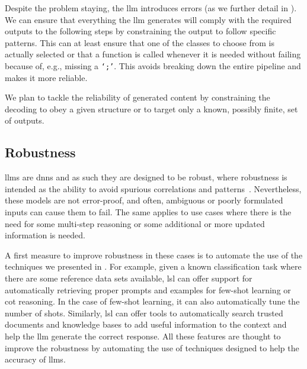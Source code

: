 \documentclass[manuscript,screen]{acmart}
\begin{document}
Despite the problem staying, the \ac{llm} introduces errors (as we further detail in ).
We can ensure that everything the \ac{llm} generates will comply with the required outputs to the following steps by constraining the output to follow specific patterns.
This can at least ensure that one of the classes to choose from is actually selected or that a function is called whenever it is needed without failing because of, e.g., missing a \texttt{`;'}.
This avoids breaking down the entire pipeline and makes it more reliable.

\begin{tcolorbox}[
    title=Reliability, %
    left=1mm,
    right=1mm,
    top=1mm,
    bottom=1mm,
    fonttitle=\bfseries, %
    boxrule=0.5pt, %
    arc=5pt, %
    width=\columnwidth %
]
We plan to tackle the reliability of generated content by constraining the decoding to obey a given structure or to target only a known, possibly finite, set of outputs.
\end{tcolorbox}

\subsection{Robustness}
\label{sec:robustness}

\acp{llm} are \acp{dnn} and as such they are designed to be robust, where robustness is intended as the ability to avoid spurious correlations and patterns~\cite{DBLP:books/daglib/0040158,DBLP:conf/nips/BrownMRSKDNSSAA20}.
Nevertheless, these models are not error-proof, and often, ambiguous or poorly formulated inputs can cause them to fail.
The same applies to use cases where there is the need for some multi-step reasoning or some additional or more updated information is needed.


A first measure to improve robustness in these cases is to automate the use of the techniques we presented in .
For example, given a known classification task where there are some reference data sets available, \ac{lsl} can offer support for automatically retrieving proper prompts and examples for few-shot learning or \ac{cot} reasoning.
In the case of few-shot learning, it can also automatically tune the number of shots.
Similarly, \ac{lsl} can offer tools to automatically search trusted documents and knowledge bases to add useful information to the context and help the \ac{llm} generate the correct response.
All these features are thought to improve the robustness by automating the use of techniques designed to help the accuracy of \acp{llm}.
\end{document}
